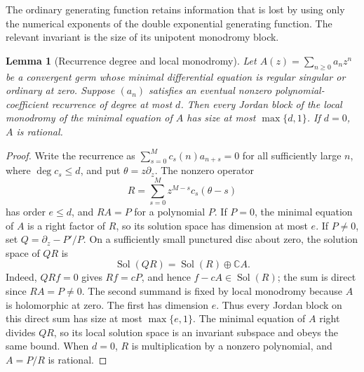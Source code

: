 \documentclass[11pt,a4paper]{article}
\newtheorem{lemma}[theorem]{Lemma}
\theoremstyle{definition}
\theoremstyle{remark}
\numberwithin{equation}{section}
\begin{document}
The ordinary generating function retains information that is lost by
using only the numerical exponents of the double exponential generating
function. The relevant invariant is the size of its unipotent monodromy
block.

\begin{lemma}[Recurrence degree and local monodromy]
\label{rev:degree-monodromy}
Let $A(z)=\sum_{n\ge0}a_nz^n$ be a convergent germ whose minimal
differential equation is regular singular or ordinary at zero.
Suppose $(a_n)$ satisfies an eventual nonzero polynomial-coefficient
recurrence of degree at most $d$. Then every Jordan block of the local
monodromy of the minimal equation of $A$ has size at most
$\max\{d,1\}$. If $d=0$, $A$ is rational.
\end{lemma}
\begin{proof}
Write the recurrence as
$\sum_{s=0}^M c_s(n)a_{n+s}=0$ for all sufficiently large $n$,
where $\deg c_s\le d$, and put $\theta=z\partial_z$. The nonzero
operator
\[
 R=\sum_{s=0}^M z^{M-s}c_s(\theta-s)
\]
has order $e\le d$, and $RA=P$ for a polynomial $P$.
If $P=0$, the minimal equation of $A$ is a right factor of $R$,
so its solution space has dimension at most $e$.
If $P\ne0$, set $Q=\partial_z-P'/P$. On a sufficiently small
punctured disc about zero, the solution space of $QR$ is
\[
                 \operatorname{Sol}(QR)
                  =\operatorname{Sol}(R)\oplus\mathbb C A.
\]
Indeed, $QRf=0$ gives $Rf=cP$, and hence $f-cA\in\operatorname{Sol}(R)$;
the sum is direct since $RA=P\ne0$.
The second summand is fixed by local monodromy because $A$ is
holomorphic at zero. The first has dimension $e$. Thus every Jordan
block on this direct sum has size at most $\max\{e,1\}$.
The minimal equation of $A$ right divides $QR$, so its local solution
space is an invariant subspace and obeys the same bound.
When $d=0$, $R$ is multiplication by a nonzero polynomial, and
$A=P/R$ is rational.
\end{proof}
\end{document}
